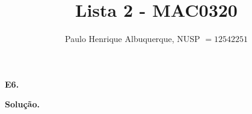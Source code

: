 \documentclass{article}
\title{Lista 2 - MAC0320}
\author{Paulo Henrique Albuquerque, NUSP $=12542251$ }
\date{}
\begin{document}
\maketitle

\textbf{E6.} 
\vspace{5mm}

\textbf{Solução.} 
\end{document}
